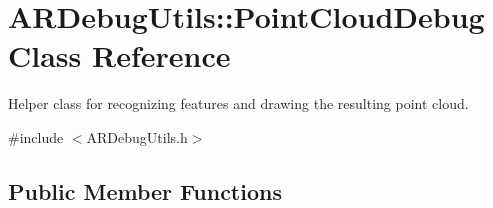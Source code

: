 \hypertarget{class_a_r_debug_utils_1_1_point_cloud_debug}{}\section{A\+R\+Debug\+Utils\+:\+:Point\+Cloud\+Debug Class Reference}
\label{class_a_r_debug_utils_1_1_point_cloud_debug}


Helper class for recognizing features and drawing the resulting point cloud.  




{\ttfamily \#include $<$A\+R\+Debug\+Utils.\+h$>$}

\subsection*{Public Member Functions}
